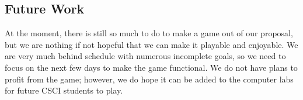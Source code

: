 \documentclass[10pt,conference,onecolumn,compsoc]{IEEEtran}
\begin{document}
\subsection{Future Work}
At the moment, there is still so much to do to make a game out of our proposal, but we are nothing if not hopeful that we can make it playable and enjoyable. We are very much behind schedule with numerous incomplete goals, so we need to focus on the next few days to make the game functional. We do not have plans to profit from the game; however, we do hope it can be added to the computer labs for future CSCI students to play. 

\end{document}

